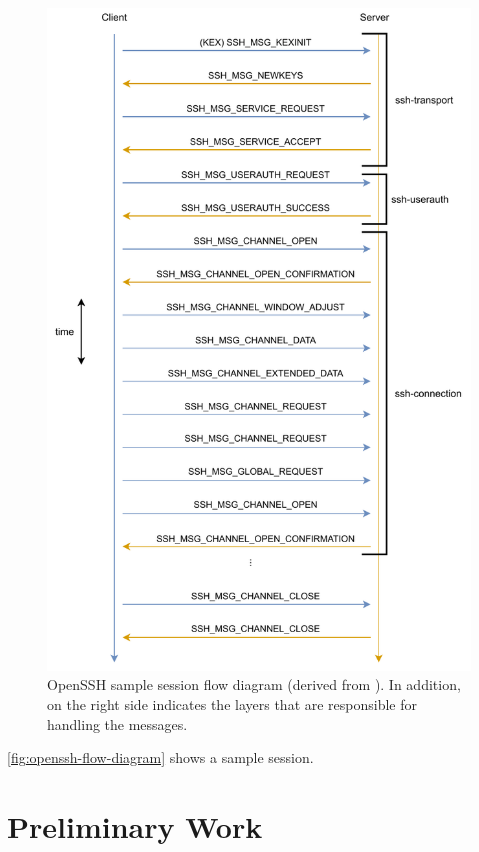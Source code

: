 \begin{figure}[ht]
    \centering
    \includegraphics{figures/ssh-flow-diagram.pdf}
    \caption[OpenSSH sample session flow diagram]{OpenSSH sample session flow diagram (derived from \cite{openssh2007}). In addition, on the right side indicates the layers that are responsible for handling the messages.}
    \label{fig:openssh-flow-diagram}
\end{figure}

\autoref{fig:openssh-flow-diagram} shows a sample session.

\section{Preliminary Work}

